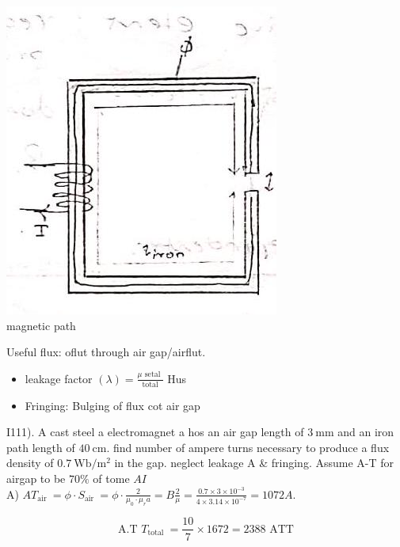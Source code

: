 \documentclass[12pt, a4paper]{article}
\begin{document}
\includegraphics[max width=\textwidth, center]{2024_06_15_ae1c13e212c06c234cc4g-05(1)}\\
magnetic path

Useful flux: oflut through air gap/airflut.

\begin{itemize}
	\item leakage factor $(\lambda)=\frac{\mu \text { setal }}{\text { total }}$ Hus
	\item Fringing: Bulging of flux cot air gap
\end{itemize}

I111). A cast steel a electromagnet a hos an air gap length of $3 \mathrm{~mm}$ and an iron path length of $40 \mathrm{~cm}$. find number of ampere turns necessary to produce a flux density of $0.7 \mathrm{~Wb} / \mathrm{m}^{2}$ in the gap. neglect leakage A \& fringing. Assume A-T for airgap to be $70 \%$ of tome $A I$\\
A) $A T_{\text {air }}=\phi \cdot S_{\text {air }}=\phi \cdot \frac{2}{\mu_{0} \cdot \mu_{r} a}=B \frac{2}{\mu}=\frac{0.7 \times 3 \times 10^{-3}}{4 \times 3.14 \times 10^{-7}}=1072 A$.

$$
	\text { A.T } T_{\text {total }}=\frac{10}{7} \times 1672=2388 \text { ATT }
$$
\end{document}
